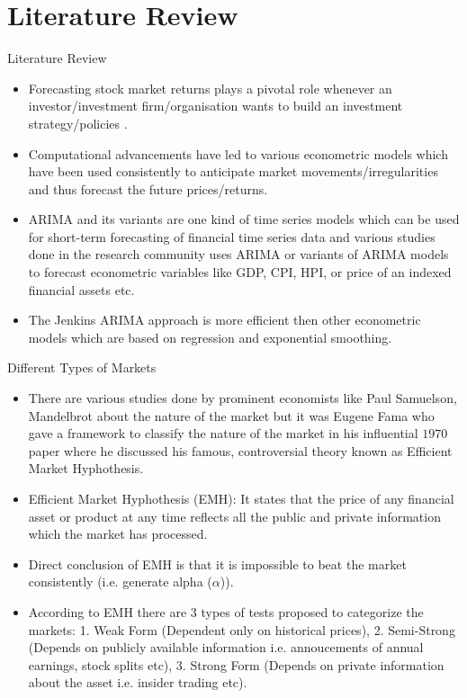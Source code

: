 \documentclass{beamer}
\begin{document}
\section{Literature Review}
\begin{frame}{Literature Review}
	\begin{itemize}
		\item Forecasting stock market returns plays a pivotal role whenever an investor/investment firm/organisation wants to build an investment strategy/policies \cite{challa_malepati_kolusu_2020}.
		      \pause
		\item Computational advancements have led to various econometric models which have been used consistently to anticipate market movements/irregularities and thus forecast the future prices/returns.
		      \pause
		\item ARIMA and its variants are one kind of time series models which can be used for short-term forecasting of financial time series data and various studies done in the research community uses ARIMA or variants of ARIMA models to forecast econometric variables like GDP, CPI, HPI, or price of an indexed financial assets etc.
		      \pause
		\item The Jenkins ARIMA approach is more efficient then other econometric models which are based on regression and exponential smoothing.
	\end{itemize}
\end{frame}

\begin{frame}{Different Types of Markets \cite{10.2307/2325486}}
	\begin{itemize}
		\item There are various studies done by prominent economists like Paul Samuelson, Mandelbrot about the nature of the market but it was Eugene Fama \cite{10.2307/2325486} who gave a framework to classify the nature of the market in his influential $1970$ paper where he discussed his famous, controversial theory known as Efficient Market Hyphothesis.
		      \pause
		\item Efficient Market Hyphothesis (EMH): It states that the price of any financial asset or product at any time reflects all the public and private information which the market has processed.
		      \pause
		\item Direct conclusion of EMH is that it is impossible to beat the market consistently (i.e. generate alpha ($\alpha$)).
		      \pause
		\item According to EMH there are $3$ types of tests proposed to categorize the markets: 1. Weak Form (Dependent only on historical prices), 2. Semi-Strong (Depends on publicly available information i.e. annoucements of annual earnings, stock splits etc), 3. Strong Form (Depends on private information about the asset i.e. insider trading etc).
	\end{itemize}
\end{frame}
\end{document}
